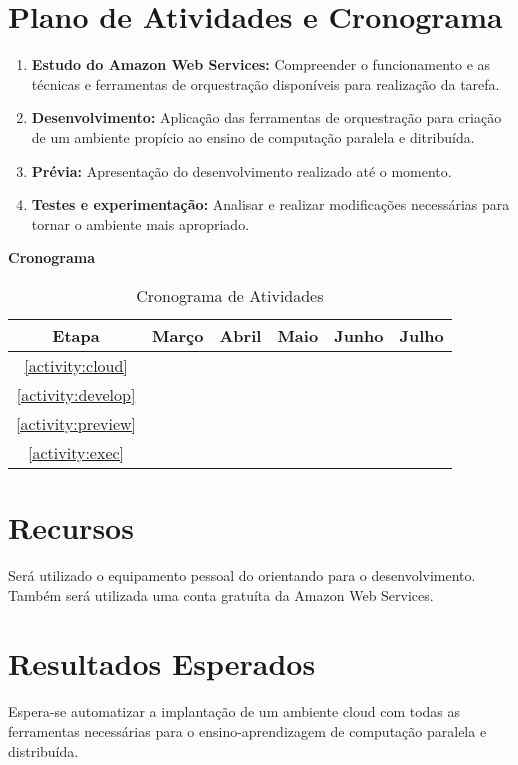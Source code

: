 \documentclass[12pt]{article}
\begin{document}
\section{Plano de Atividades e Cronograma}
\begin{enumerate}
\item \label{activity:cloud} \textbf{Estudo do Amazon Web Services: }
Compreender o funcionamento e as técnicas e ferramentas de orquestração disponíveis para realização da tarefa.
\item \label{activity:develop} \textbf{Desenvolvimento: }
Aplicação das ferramentas de orquestração para criação de um ambiente propício ao ensino de computação paralela e ditribuída.
\item \label{activity:preview} \textbf{Prévia: }
Apresentação do desenvolvimento realizado até o momento.
\item \label{activity:exec} \textbf{Testes e experimentação: }
Analisar e realizar modificações necessárias para tornar o ambiente mais apropriado.


\end{enumerate}
\textbf{Cronograma}

\begin{table}[ht]
\centering
\begin{tabular}{c|ccccc}
	Etapa & Março & Abril & Maio & Junho & Julho \\ \hline
	\ref{activity:cloud} & \checkmark & & & \\
	\ref{activity:develop} & \checkmark & \checkmark & & \\
	\ref{activity:preview} & & & \checkmark & & \\
	\ref{activity:exec} & & & \checkmark & \checkmark & \checkmark

\end{tabular}
\caption{Cronograma de Atividades}

\end{table}
\section{Recursos}
Será utilizado o equipamento pessoal do orientando para o desenvolvimento. Também será utilizada uma conta gratuíta da Amazon Web Services.

\section{Resultados Esperados}
Espera-se automatizar a implantação de um ambiente cloud com todas as ferramentas necessárias para o ensino-aprendizagem de computação paralela e distribuída.



\end{document}
